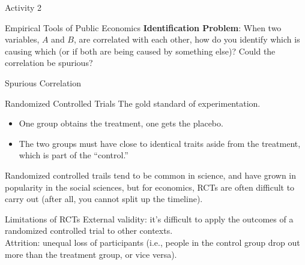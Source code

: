 \documentclass[8pt]{extarticle}
\begin{document}
  \begin{problem}{Activity 2}
   \begin{tcbraster}[raster columns = 1,colframe = black!75!white,colback=white]
   \end{tcbraster} 
  \end{problem}
  \begin{problem}{Empirical Tools of Public Economics}
    \textbf{Identification Problem}: When two variables, $A$ and $B$, are correlated with each other, how do you identify which is causing which (or if both are being caused by something else)? Could the correlation be spurious?
    \begin{problem}{Spurious Correlation}
      \begin{tcbraster}[raster columns = 1,colframe = black!75!white,colback=white]
      \end{tcbraster}
    \end{problem}
    \begin{problem}{Randomized Controlled Trials}
      The gold standard of experimentation.
      \begin{itemize}
        \item One group obtains the treatment, one gets the placebo.
        \item The two groups must have close to identical traits aside from the treatment, which is part of the ``control.''
      \end{itemize}
      Randomized controlled trails tend to be common in science, and have grown in popularity in the social sciences, but for economics, RCTs are often difficult to carry out (after all, you cannot split up the timeline).
      \begin{problem}{Limitations of RCTs}
        External validity: it's difficult to apply the outcomes of a randomized controlled trial to other contexts.\\

        Attrition: unequal loss of participants (i.e., people in the control group drop out more than the treatment group, or vice versa).\\


\end{problem}
\end{problem}
\end{problem}
\end{document}
